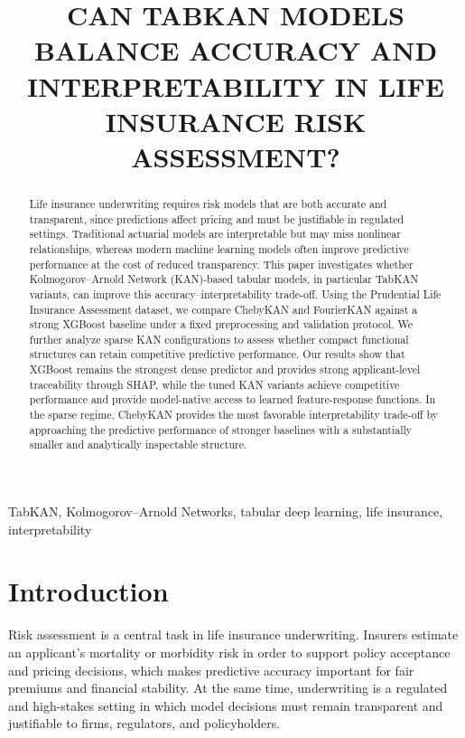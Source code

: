 \documentclass{article}
\title{CAN TABKAN MODELS BALANCE ACCURACY AND INTERPRETABILITY IN LIFE INSURANCE RISK ASSESSMENT?}
\begin{document}
\maketitle

\begin{abstract}
Life insurance underwriting requires risk models that are both accurate and transparent, since predictions affect pricing and must be justifiable in regulated settings. Traditional actuarial models are interpretable but may miss nonlinear relationships, whereas modern machine learning models often improve predictive performance at the cost of reduced transparency. This paper investigates whether Kolmogorov--Arnold Network (KAN)-based tabular models, in particular TabKAN variants, can improve this accuracy--interpretability trade-off. Using the Prudential Life Insurance Assessment dataset, we compare ChebyKAN and FourierKAN against a strong XGBoost baseline under a fixed preprocessing and validation protocol. We further analyze sparse KAN configurations to assess whether compact functional structures can retain competitive predictive performance. Our results show that XGBoost remains the strongest dense predictor and provides strong applicant-level traceability through SHAP, while the tuned KAN variants achieve competitive performance and provide model-native access to learned feature-response functions. In the sparse regime, ChebyKAN provides the most favorable interpretability trade-off by approaching the predictive performance of stronger baselines with a substantially smaller and analytically inspectable structure.
\end{abstract}

\begin{keywords}
TabKAN, Kolmogorov--Arnold Networks, tabular deep learning, life insurance, interpretability
\end{keywords}

\section{Introduction}
\label{sec:intro}

Risk assessment is a central task in life insurance underwriting. Insurers estimate an applicant's mortality or morbidity risk in order to support policy acceptance and pricing decisions, which makes predictive accuracy important for fair premiums and financial stability. At the same time, underwriting is a regulated and high-stakes setting in which model decisions must remain transparent and justifiable to firms, regulators, and policyholders.
\end{document}
